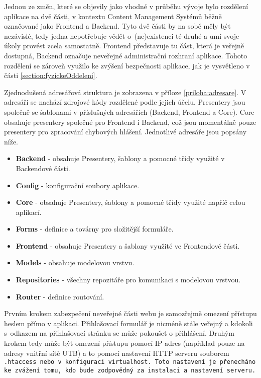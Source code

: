 Jednou ze změn, které se objevily jako vhodné v průběhu vývoje bylo rozdělení aplikace na dvě části, v kontextu Content Management Systémů běžně označované jako Frontend a Backend. Tyto dvě části by na sobě měly být nezávislé, tedy jedna nepotřebuje vědět o~(ne)existenci té druhé a umí svoje úkoly provést zcela samostatně. Frontend představuje tu část, která je veřejně dostupná, Backend označuje neveřejné administrační rozhraní aplikace. Tohoto rozdělení se zároveň využilo ke zvýšení bezpečnosti aplikace, jak je vysvětleno v části \ref{section:fyzickeOddeleni}.

Zjednodušená adresářová struktura je zobrazena v příloze \ref{priloha:adresare}. V adresáři  se nachází zdrojové kódy rozdělené podle jejich účelu. Presentery jsou společně se šablonami v příslušných adresářích (Backend, Frontend a Core). Core obsahuje presentery společné pro Frontend i Backend, což jsou momentálně pouze presentery pro zpracování chybových hlášení. Jednotlivé adresáře jsou popsány níže.
\begin{itemize}
	\item  \textbf{Backend} - obsahuje Presentery, šablony a pomocné třídy využité v Backendové části.
	\item \textbf{Config} - konfigurační soubory aplikace.
	\item \textbf{Core} - obsahuje Presentery, šablony a pomocné třídy využité napříč celou aplikací.
	\item \textbf{Forms} - definice a továrny pro složitější formuláře.
	\item \textbf{Frontend} - obsahuje Presentery a šablony využité ve Frontendové části.
	\item \textbf{Models} - obsahuje modelovou vrstvu.
	\item \textbf{Repositories} - všechny repozitáře pro komunikaci s modelovou vrstvou.
	\item \textbf{Router} - definice routování.
\end{itemize}

 \label{section:fyzickeOddeleni}
Prvním krokem zabezpečení neveřejné části webu je samozřejmě omezení přístupu heslem přímo v aplikaci. Přihlašovací formulář je nicméně stále veřejný a kdokoli s~odkazem na přihlašovací stránku se může pokoušet o přihlášení. Druhým krokem tedy může být omezení přístupu pomocí IP adres (například pouze na adresy vnitřní sítě UTB) a to pomocí nastavení HTTP serveru souborem \tt{.htaccess} nebo v~konfiguraci \tt{virtualhost}. Toto nastavení je přenecháno ke zvážení tomu, kdo bude zodpovědný za instalaci a nastavení serveru.

